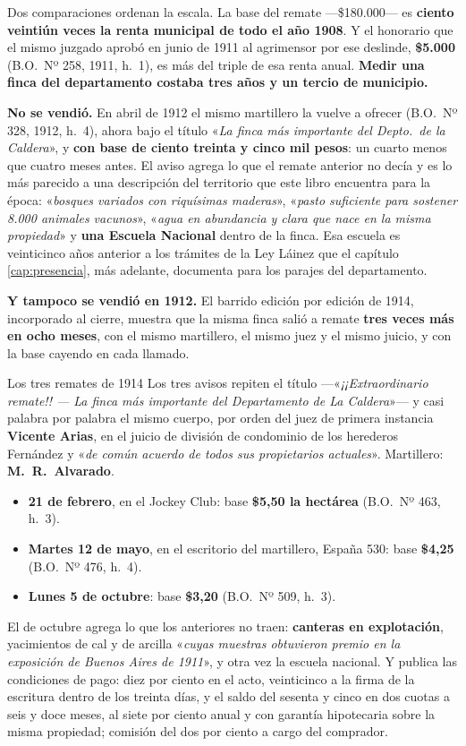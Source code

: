 Dos comparaciones ordenan la escala. La base del remate ---\$180.000--- es \textbf{ciento veintiún
veces la renta municipal de todo el año 1908}. Y el honorario que el mismo juzgado aprobó en
junio de 1911 al agrimensor por ese deslinde, \textbf{\$5.000} (B.O.\ Nº 258, 1911, h.\ 1), es más del triple de esa renta
anual. \textbf{Medir una finca del departamento costaba tres años y un tercio de municipio.}

\textbf{No se vendió.} En abril de 1912 el mismo martillero la vuelve a ofrecer (B.O.\ Nº 328, 1912, h.\ 4), ahora bajo el
título «\textit{La finca más importante del Depto.\ de la Caldera}», y \textbf{con base de ciento
treinta y cinco mil pesos}: un cuarto menos que cuatro meses antes. El aviso agrega lo que el
remate anterior no decía y es lo más parecido a una descripción del territorio que este libro
encuentra para la época: «\textit{bosques variados con riquísimas maderas}», «\textit{pasto
suficiente para sostener 8.000 animales vacunos}», «\textit{agua en abundancia y clara que nace
en la misma propiedad}» y \textbf{una Escuela Nacional} dentro de la finca. Esa escuela es
veinticinco años anterior a los trámites de la Ley Láinez que el capítulo \ref{cap:presencia}, más adelante,
documenta para los parajes del departamento.

\textbf{Y tampoco se vendió en 1912.} El barrido edición por edición de 1914, incorporado al
cierre, muestra que la misma finca salió a remate \textbf{tres veces más en ocho meses}, con el
mismo martillero, el mismo juez y el mismo juicio, y con la base cayendo en cada llamado.

\begin{ficha}{Los tres remates de 1914}
Los tres avisos repiten el título ---«\textit{¡¡Extraordinario remate!! --- La finca más
importante del Departamento de La Caldera}»--- y casi palabra por palabra el mismo cuerpo, por
orden del juez de primera instancia \textbf{Vicente Arias}, en el juicio de división de
condominio de los herederos Fernández y «\textit{de común acuerdo de
todos sus propietarios actuales}». Martillero: \textbf{M.\ R.\ Alvarado}.
\begin{itemize}[leftmargin=*,nosep]
\item \textbf{21 de febrero}, en el Jockey Club: base \textbf{\$5,50 la hectárea} (B.O.\ Nº 463, h.\ 3).
\item \textbf{Martes 12 de mayo}, en el escritorio del martillero, España 530: base \textbf{\$4,25} (B.O.\ Nº 476, h.\ 4).
\item \textbf{Lunes 5 de octubre}: base \textbf{\$3,20} (B.O.\ Nº 509, h.\ 3).
\end{itemize}
El de octubre agrega lo que los anteriores no traen: \textbf{canteras en explotación},
yacimientos de cal y de arcilla «\textit{cuyas muestras obtuvieron premio en la exposición de
Buenos Aires de 1911}», y otra vez la escuela nacional. Y publica las condiciones de pago:
diez por ciento en el acto, veinticinco a la firma de la escritura dentro de los treinta días,
y el saldo del sesenta y cinco en dos cuotas a seis y doce meses, al siete por ciento anual y
con garantía hipotecaria sobre la misma propiedad; comisión del dos por ciento a cargo del
comprador.
\end{ficha}

